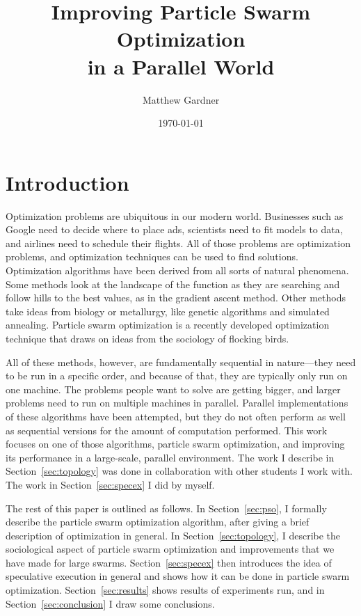 \documentclass[onecolumn, 12pt]{article}
\title{Improving Particle Swarm Optimization \\ in a Parallel World}
\author{Matthew Gardner}
\date{\today}
\begin{document}
\maketitle

\section{Introduction}
\label{sec:intro}

Optimization problems are ubiquitous in our modern world.  Businesses such as
Google need to decide where to place ads, scientists need to fit models to
data, and airlines need to schedule their flights.  All of those problems are
optimization problems, and optimization techniques can be used to find
solutions.  Optimization algorithms have been derived from all sorts of natural
phenomena.  Some methods look at the landscape of the function as they are
searching and follow hills to the best values, as in the gradient ascent
method.  Other methods take ideas from biology or metallurgy, like genetic
algorithms and simulated annealing.  Particle swarm optimization is a recently
developed optimization technique that draws on ideas from the sociology of
flocking birds.  

All of these methods, however, are fundamentally sequential in nature---they
need to be run in a specific order, and because of that, they are typically
only run on one machine.  The problems people want to solve are getting bigger,
and larger problems need to run on multiple machines in parallel.  Parallel
implementations of these algorithms have been attempted, but they do not often
perform as well as sequential versions for the amount of computation performed.
This work focuses on one of those algorithms, particle swarm optimization, and
improving its performance in a large-scale, parallel environment.  The work I
describe in Section~\ref{sec:topology} was done in collaboration with other
students I work with.  The work in Section~\ref{sec:specex} I did by myself.

The rest of this paper is outlined as follows.  In Section~\ref{sec:pso}, I
formally describe the particle swarm optimization algorithm, after giving a
brief description of optimization in general.  In Section~\ref{sec:topology},
I describe the sociological aspect of particle swarm optimization and
improvements that we have made for large swarms.  Section~\ref{sec:specex} then
introduces the idea of speculative execution in general and shows how it can be
done in particle swarm optimization.  Section~\ref{sec:results} shows results
of experiments run, and in Section~\ref{sec:conclusion} I draw some
conclusions.
\end{document}
